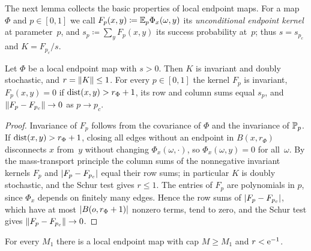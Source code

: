 The next lemma collects the basic properties of local endpoint maps. For a map $\Phi$ and $p\in[0,1]$
we call $F_p(x,y)\coloneqq\mathbb E_p\Phi_x(\omega,y)$ its \emph{unconditional endpoint kernel} at
parameter~$p$, and $s_p\coloneqq\sum_yF_p(x,y)$ its success probability at~$p$; thus $s=s_{p_c}$ and
$K=F_{p_c}/s$.

\begin{lemma}\label{lem:map-basic}
Let $\Phi$ be a local endpoint map with $s>0$. Then $K$ is invariant and doubly stochastic, and
$r=\lVert K\rVert\le1$. For every $p\in[0,1]$ the kernel $F_p$ is invariant, $F_p(x,y)=0$ if
$\operatorname{dist}(x,y)>r_\Phi+1$, its row and column sums equal $s_p$, and $\lVert F_p-F_{p_c}\rVert\to0$ as
$p\to p_c$.
\end{lemma}

\begin{proof}
Invariance of $F_p$ follows from the covariance of $\Phi$ and the invariance of $\mathbb P_p$. If
$\operatorname{dist}(x,y)>r_\Phi+1$, closing all edges without an endpoint in $B(x,r_\Phi)$ disconnects $x$ from~$y$
without changing $\Phi_x(\omega,\cdot)$, so $\Phi_x(\omega,y)=0$ for all~$\omega$. By the mass-transport
principle the column sums of the nonnegative invariant kernels $F_p$ and $\lvert F_p-F_{p_c}\rvert$ equal their
row sums; in particular $K$ is doubly stochastic, and the Schur test gives $r\le1$. The entries of $F_p$
are polynomials in $p$, since $\Phi_x$ depends on finitely many edges. Hence the row sums of
$\lvert F_p-F_{p_c}\rvert$, which have at most $\lvert B(o,r_\Phi+1)\rvert$ nonzero terms, tend to zero, and the
Schur test gives $\lVert F_p-F_{p_c}\rVert\to0$.
\end{proof}

\begin{lemma}\label{lem:start}
For every $M_1$ there is a local endpoint map with cap $M\ge M_1$ and $r<\mathrm{e}^{-1}$.
\end{lemma}

